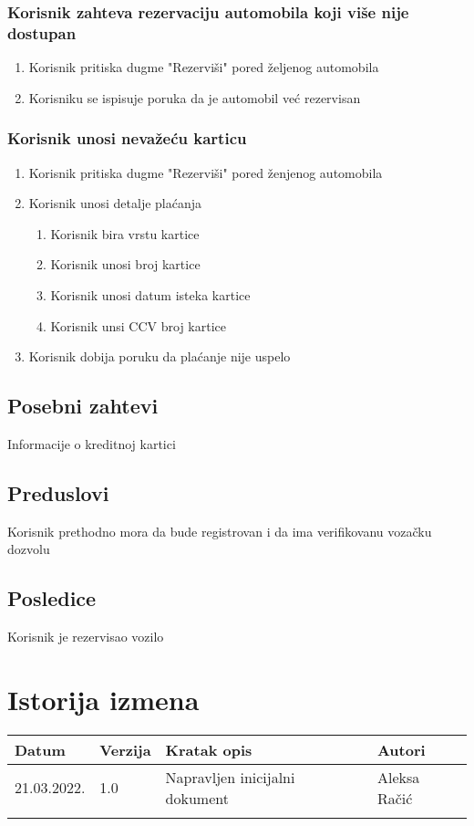 \documentclass[12pt]{article}
\begin{document}
\subsubsection{Korisnik zahteva rezervaciju automobila koji više nije dostupan}
\begin{enumerate}
  \item Korisnik pritiska dugme "Rezerviši" pored željenog automobila
  \item Korisniku se ispisuje poruka da je automobil već rezervisan
\end{enumerate}
\subsubsection{Korisnik unosi nevažeću karticu}
\begin{enumerate}
\item Korisnik pritiska dugme "Rezerviši" pored ženjenog automobila
  \item Korisnik unosi detalje plaćanja
  \begin{enumerate}
    \item Korisnik bira vrstu kartice
    \item Korisnik unosi broj kartice
    \item Korisnik unosi datum isteka kartice
    \item Korisnik unsi CCV broj kartice
\end{enumerate}
  \item Korisnik dobija poruku da plaćanje nije uspelo
\end{enumerate}
\subsection{Posebni zahtevi}
Informacije o kreditnoj kartici
\subsection{Preduslovi}
Korisnik prethodno mora da bude registrovan i da ima verifikovanu vozačku dozvolu
\subsection{Posledice}
Korisnik je rezervisao vozilo

\section{Istorija izmena}
\begin{center}
\begin{tabular}{ | m{2cm} | m{1.5cm}| m{6cm} | m{5cm} | } 
\hline
Datum & Verzija & Kratak opis & Autori \\ 
\hline
 21.03.2022. & 1.0 & Napravljen inicijalni dokument & Aleksa Račić\\ 
\hline
&&&\\ 
\hline
\end{tabular}
\end{center}
\end{document}
